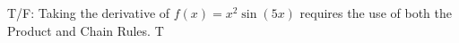 {T/F: Taking the derivative of $f(x) = x^2\sin(5x)$ requires the use of both the Product and Chain Rules.}
{T}
